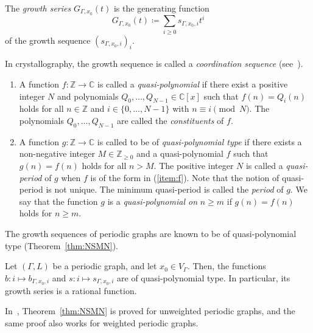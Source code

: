 \documentclass[ALCO,published]{cedram}
\theoremstyle{remark}
\begin{document}
The \textit{growth series} $G_{\Gamma, x_0}(t)$ is the generating function 
\[
G_{\Gamma, x_0}(t) \coloneqq  \sum _{i \ge 0} s_{\Gamma, x_0,i} t^i
\]
of the growth sequence $(s_{\Gamma, x_0,i})_{i}$. 

\begin{rmk}
In crystallography, the growth sequence is called a \textit{coordination sequence} (see~\cite{NSMN21}). 
\end{rmk}

\begin{defi}\label{defi:qp}  \hfill
\begin{enumerate}
\item \label{item:f}
A function $f: \mathbb{Z} \to \mathbb{C}$ is called a \textit{quasi-polynomial} 
if there exist a positive integer $N$ and polynomials $Q_0, \ldots, Q_{N-1} \in \mathbb{C}[x]$ such that 
$f(n) = Q_i(n)$ holds for all $n \in \mathbb{Z}$ and $i \in \{ 0, \ldots , N-1 \}$ with $n \equiv i \pmod N$. 
The polynomials $Q_0, \ldots, Q_{N-1}$ are called the \textit{constituents} of $f$. 

\item 
A function $g: \mathbb{Z} \to \mathbb{C}$ is called to be of \textit{quasi-polynomial type} if 
there exists a non-negative integer $M \in \mathbb{Z}_{\ge 0}$ and a quasi-polynomial $f$ such that
$g(n) = f(n)$ holds for all $n > M$. 
The positive integer $N$ is called a \textit{quasi-period} of $g$ when $f$ is of the form in (\ref{item:f}). 
Note that the notion of quasi-period is not unique. 
The minimum quasi-period is called the \textit{period} of $g$. 
We say that the function $g$ is a \textit{quasi-polynomial on} $n \ge m$ if 
$g(n) = f(n)$ holds for $n \ge m$. 
\end{enumerate}
\end{defi}

The growth sequences of periodic graphs are known to be of quasi-polynomial type (Theorem~\ref{thm:NSMN}). 
\begin{thm}\label{thm:NSMN}
Let $(\Gamma, L)$ be a periodic graph, and let $x_0 \in V_{\Gamma}$. 
Then, the functions $b: i \mapsto b_{\Gamma, x_0, i}$ and $s: i \mapsto s_{\Gamma, x_0, i}$ are of quasi-polynomial type. 
In particular, its growth series is a rational function. 
\end{thm}

\noindent
In~\cite{NSMN21}, Theorem~\ref{thm:NSMN} is proved for unweighted periodic graphs, 
and the same proof also works for weighted periodic graphs. 
\end{document}
